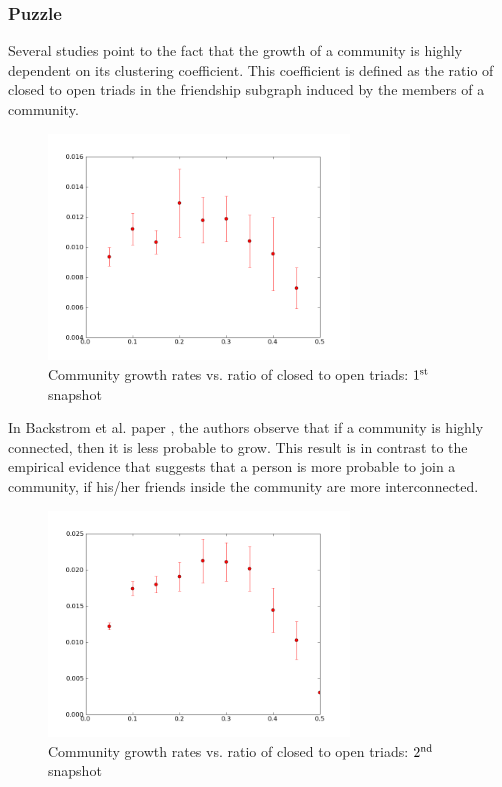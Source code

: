 \subsubsection{Puzzle}

Several studies point to the fact that the growth of a community is highly dependent on its clustering coefficient.
This coefficient is defined as the ratio of closed to open triads in the friendship subgraph
induced by the members of a community.

\begin{figure}
  \begin{center}
    \includegraphics[width=8cm]{first.png}
    \caption{Community growth rates vs. ratio of closed to open triads: $1^{\rm st}$ snapshot}\label{fig:edge-a}
    \end{center}
\end{figure}


In Backstrom et al. paper \cite{group_formation}, the authors observe that if a community is highly connected, then it is less probable to grow.  This result is in contrast to the empirical evidence \cite{group_formation}  that suggests that a person is more probable to join a community,  if his/her friends inside the community are more interconnected.


\begin{figure}
  \begin{center}
    \includegraphics[width=8cm]{second.png}
    \caption{Community growth rates vs. ratio of closed to open triads: $2^{\rm nd}$ snapshot}\label{fig:edge-b}
    \end{center}
\end{figure}


